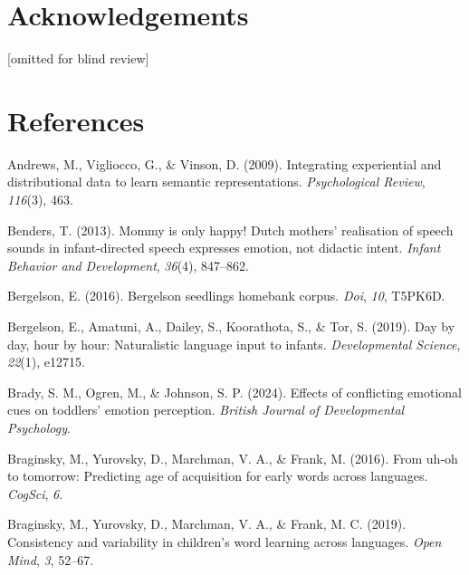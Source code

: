 \documentclass[10pt, letterpaper]{article}
\begin{document}
\section{Acknowledgements}\label{acknowledgements}

{[}omitted for blind review{]}

\section{References}\label{references}

\setlength{\parindent}{-0.1in} 
\setlength{\leftskip}{0.125in}

\noindent

\label{refs}
\begin{CSLReferences}{1}{0}
Andrews, M., Vigliocco, G., \& Vinson, D. (2009). Integrating
experiential and distributional data to learn semantic representations.
\emph{Psychological Review}, \emph{116}(3), 463.

Benders, T. (2013). Mommy is only happy! Dutch mothers' realisation of
speech sounds in infant-directed speech expresses emotion, not didactic
intent. \emph{Infant Behavior and Development}, \emph{36}(4), 847--862.

Bergelson, E. (2016). Bergelson seedlings homebank corpus. \emph{Doi},
\emph{10}, T5PK6D.

Bergelson, E., Amatuni, A., Dailey, S., Koorathota, S., \& Tor, S.
(2019). Day by day, hour by hour: Naturalistic language input to
infants. \emph{Developmental Science}, \emph{22}(1), e12715.

Brady, S. M., Ogren, M., \& Johnson, S. P. (2024). Effects of
conflicting emotional cues on toddlers' emotion perception.
\emph{British Journal of Developmental Psychology}.

Braginsky, M., Yurovsky, D., Marchman, V. A., \& Frank, M. (2016). From
uh-oh to tomorrow: Predicting age of acquisition for early words across
languages. \emph{CogSci}, \emph{6}.

Braginsky, M., Yurovsky, D., Marchman, V. A., \& Frank, M. C. (2019).
Consistency and variability in children's word learning across
languages. \emph{Open Mind}, \emph{3}, 52--67.


\end{CSLReferences}
\end{document}
